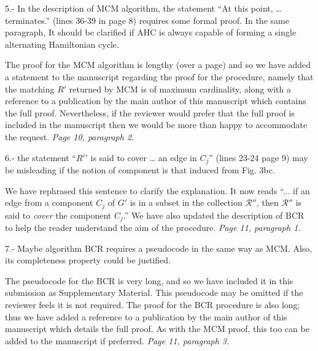 \documentclass[a4paper,11pt]{article}
\newcommand{\ahc}[1]{{\color{myBlue}#1}}
\newcommand{\resp}[1]{{\color{myDarkBlue2}#1}} %
\begin{document}
5.- In the description of MCM algorithm, the statement ``At this point, … terminates.'' (lines 36-39 in page 8) requires some formal proof. In the same paragraph, It should be clarified if AHC is always capable of forming a single alternating Hamiltonian cycle. %


\resp{The proof for the MCM algorithm is lengthy (over a page) and so we have added a statement to the manuscript regarding the proof for the procedure, namely that the matching $R'$ returned by MCM is of maximum cardinality, along with a reference to a publication by the main author of this manuscript which contains the full proof. Nevertheless, if the reviewer would prefer that the full proof is included in the manuscript then we would be more than happy to accommodate the request. \textit{Page 10, paragraph 2.}}


6.- the statement ``$R'$' is said to cover … an edge in $C_j$'' (lines 23-24 page 9) may be misleading if the notion of component is that induced from Fig. 3bc. %


\resp{We have rephrased this sentence to clarify the explanation. It now reads ``... if an edge from a component $C_j$ of $G'$ is in a subset in the collection $\mathcal{R}''$, then $\mathcal{R}''$ is said to \emph{cover} the component $C_j$.'' We have also updated the description of BCR to help the reader understand the aim of the procedure. \textit{Page 11, paragraph 1.}}


7.- Maybe algorithm BCR requires a pseudocode in the same way as MCM. Also, its completeness property could be justified. %


\resp{The pseudocode for the BCR is very long, and so we have included it in this submission as Supplementary Material. This pseudocode may be omitted if the reviewer feels it is not required. The proof for the BCR procedure is also long; thus we have added a reference to a publication by the main author of this manuscript which details the full proof. As with the MCM proof, this too can be added to the manuscript if preferred. \textit{Page 11, paragraph 3.}}
\end{document}

